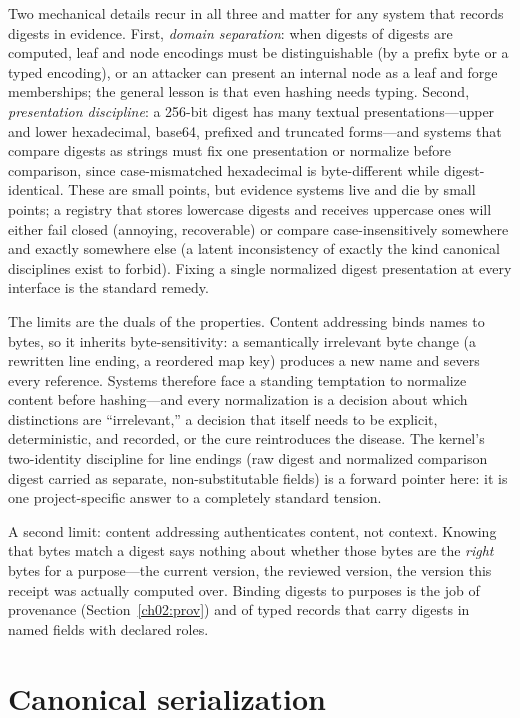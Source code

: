 Two mechanical details recur in all three and matter for any system
that records digests in evidence. First, \emph{domain separation}:
when digests of digests are computed, leaf and node encodings must be
distinguishable (by a prefix byte or a typed encoding), or an
attacker can present an internal node as a leaf and forge
memberships; the general lesson is that even hashing needs typing.
Second, \emph{presentation discipline}: a 256-bit digest has many
textual presentations---upper and lower hexadecimal, base64, prefixed
and truncated forms---and systems that compare digests as strings
must fix one presentation or normalize before comparison, since
case-mismatched hexadecimal is byte-different while
digest-identical. These are small points, but evidence systems live
and die by small points; a registry that stores lowercase digests
and receives uppercase ones will either fail closed (annoying,
recoverable) or compare case-insensitively somewhere and exactly
somewhere else (a latent inconsistency of exactly the kind canonical
disciplines exist to forbid). Fixing a single normalized digest
presentation at every interface is the standard remedy.

The limits are the duals of the properties. Content addressing binds
names to bytes, so it inherits byte-sensitivity: a semantically
irrelevant byte change (a rewritten line ending, a reordered map key)
produces a new name and severs every reference. Systems therefore face
a standing temptation to normalize content before hashing---and every
normalization is a decision about which distinctions are ``irrelevant,''
a decision that itself needs to be explicit, deterministic, and
recorded, or the cure reintroduces the disease. The kernel's
two-identity discipline for line endings (raw digest and normalized
comparison digest carried as separate, non-substitutable fields) is a
forward pointer here: it is one project-specific answer to a
completely standard tension.

A second limit: content addressing authenticates content, not
context. Knowing that bytes match a digest says nothing about whether
those bytes are the \emph{right} bytes for a purpose---the current
version, the reviewed version, the version this receipt was actually
computed over. Binding digests to purposes is the job of provenance
(Section~\ref{ch02:prov}) and of typed records that carry digests in
named fields with declared roles.

\section{Canonical serialization}\label{ch02:canonical}

